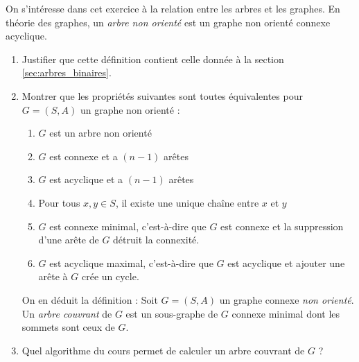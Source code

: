 \documentclass[../../../main.tex]{subfiles}
\begin{document}
 On s'intéresse dans cet exercice à la relation entre les arbres et les graphes.
 {
	En théorie des graphes, un \textit{arbre non orienté} est un graphe non orienté connexe acyclique.
}
\begin{enumerate}
	\item Justifier que cette définition contient celle donnée à la section \ref{sec:arbres_binaires}.
	\item Montrer que les propriétés suivantes sont toutes équivalentes pour $G = (S, A)$ un graphe non orienté :
	\begin{enumerate}
		\item $G$ est un arbre non orienté
		\item $G$ est connexe et a $(n-1)$ arêtes
		\item $G$ est acyclique et a $(n-1)$ arêtes
		\item Pour tous $x, y\in S$, il existe une unique chaîne entre $x$ et $y$
		\item $G$ est connexe minimal, c'est-à-dire que $G$ est connexe et la suppression d'une arête de $G$ détruit la connexité.
		\item $G$ est acyclique maximal, c'est-à-dire que $G$ est acyclique et ajouter une arête à $G$ crée un cycle.
	\end{enumerate}
	On en déduit la définition :
 {
	Soit $G = (S, A)$ un graphe connexe \textit{non orienté}. Un \textit{arbre couvrant} de $G$ est un sous-graphe de $G$ connexe minimal dont les sommets sont ceux de $G$.
}\vspace*{5mm}
	\item Quel algorithme du cours permet de calculer un arbre couvrant de $G$ ?
\end{enumerate}
\end{document}
